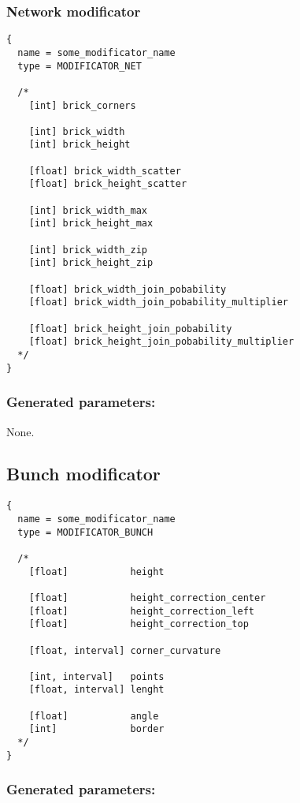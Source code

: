 \documentclass[9pt]{article}
\begin{document}
\subsubsection{Network modificator}

\begin{verbatim}
{
  name = some_modificator_name
  type = MODIFICATOR_NET

  /*
    [int] brick_corners
        
    [int] brick_width
    [int] brick_height
        
    [float] brick_width_scatter
    [float] brick_height_scatter
        
    [int] brick_width_max
    [int] brick_height_max
        
    [int] brick_width_zip
    [int] brick_height_zip
        
    [float] brick_width_join_pobability
    [float] brick_width_join_pobability_multiplier
        
    [float] brick_height_join_pobability
    [float] brick_height_join_pobability_multiplier
  */
}
\end{verbatim}

\subsubsection*{Generated parameters:}

None.

\subsection{Bunch modificator}

\begin{verbatim}
{
  name = some_modificator_name
  type = MODIFICATOR_BUNCH

  /*
    [float]           height
    
    [float]           height_correction_center
    [float]           height_correction_left
    [float]           height_correction_top      
    
    [float, interval] corner_curvature
    
    [int, interval]   points
    [float, interval] lenght
    
    [float]           angle
    [int]             border
  */
}
\end{verbatim}

\subsubsection*{Generated parameters:}
\end{document}
